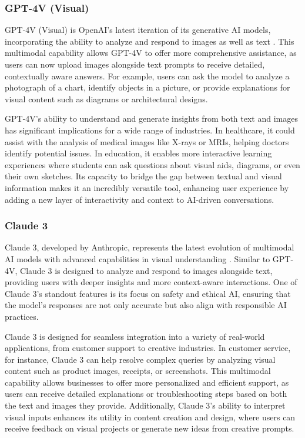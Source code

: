 \subsubsection{GPT-4V (Visual)}

GPT-4V (Visual) is OpenAI's latest iteration of its generative AI models, incorporating the ability to analyze and respond to images as well as text \cite{openai2023gpt4}. 
This multimodal capability allows GPT-4V to offer more comprehensive assistance, as users can now upload images alongside text prompts to receive detailed, contextually aware answers. 
For example, users can ask the model to analyze a photograph of a chart, identify objects in a picture, or provide explanations for visual content such as diagrams or architectural designs.

GPT-4V's ability to understand and generate insights from both text and images has significant implications for a wide range of industries. 
In healthcare, it could assist with the analysis of medical images like X-rays or MRIs, helping doctors identify potential issues. 
In education, it enables more interactive learning experiences where students can ask questions about visual aids, diagrams, or even their own sketches. 
Its capacity to bridge the gap between textual and visual information makes it an incredibly versatile tool, enhancing user experience by adding a new layer of interactivity and context to AI-driven conversations.

\subsubsection{Claude 3}

Claude 3, developed by Anthropic, represents the latest evolution of multimodal AI models with advanced capabilities in visual understanding \cite{anthropic2023claude}. 
Similar to GPT-4V, Claude 3 is designed to analyze and respond to images alongside text, providing users with deeper insights and more context-aware interactions. 
One of Claude 3's standout features is its focus on safety and ethical AI, ensuring that the model's responses are not only accurate but also align with responsible AI practices.

Claude 3 is designed for seamless integration into a variety of real-world applications, from customer support to creative industries. 
In customer service, for instance, Claude 3 can help resolve complex queries by analyzing visual content such as product images, receipts, or screenshots. 
This multimodal capability allows businesses to offer more personalized and efficient support, as users can receive detailed explanations or troubleshooting steps based on both the text and images they provide. 
Additionally, Claude 3's ability to interpret visual inputs enhances its utility in content creation and design, where users can receive feedback on visual projects or generate new ideas from creative prompts.

